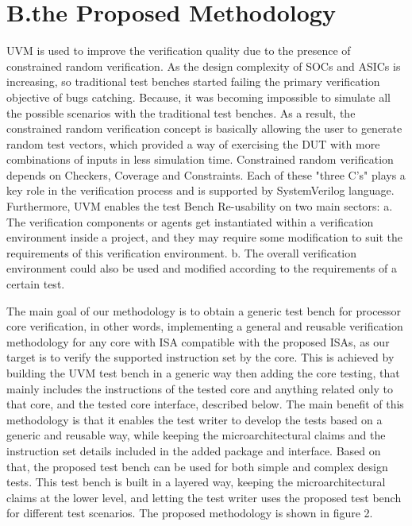 \documentclass[conference,10 pt,twoside]{IEEEtran}
\begin{document}
\section*{B.the Proposed Methodology}
UVM is used to improve the verification quality due to the presence of constrained random verification. As the design complexity of SOCs and ASICs is increasing, so traditional test benches started failing the primary verification objective of bugs catching. Because, it was becoming impossible to simulate all the possible scenarios with the traditional test benches. As a result, the constrained random verification concept is basically allowing the user to generate random test vectors, which provided a way of exercising the DUT with more combinations of inputs in less simulation time. Constrained random verification depends on Checkers, Coverage and Constraints. Each of these "three C's" plays a key role in the verification process and is supported by SystemVerilog language. Furthermore, UVM enables the test Bench Re-usability on two main sectors:
\newline a. The verification components or agents get instantiated within a verification environment inside a project, and they may require some modification to suit the requirements of this verification environment. \newline b. The overall verification environment could also be used and modified according to the requirements of a certain test.\newline
\par
The main goal of our methodology is to obtain a generic test bench for processor core verification, in other words, implementing a general and reusable verification methodology for any core with ISA compatible with the proposed ISAs, as our target is to verify the supported instruction set by the core. This is achieved by building the UVM test bench in a generic way then adding the core testing, that mainly includes the instructions of the tested core and anything related only to that core, and the tested core interface, described below. The main benefit of this methodology is that it enables the test writer to develop the tests based on a generic and reusable way, while keeping the microarchitectural claims and the instruction set details included in the added package and interface. Based on that, the proposed test bench can be used for both simple and complex design tests. This test bench is built in a layered way, keeping the microarchitectural claims at the lower level, and letting the test writer uses the proposed test bench for different test scenarios. The proposed methodology is shown in figure 2.\newline
\end{document}
